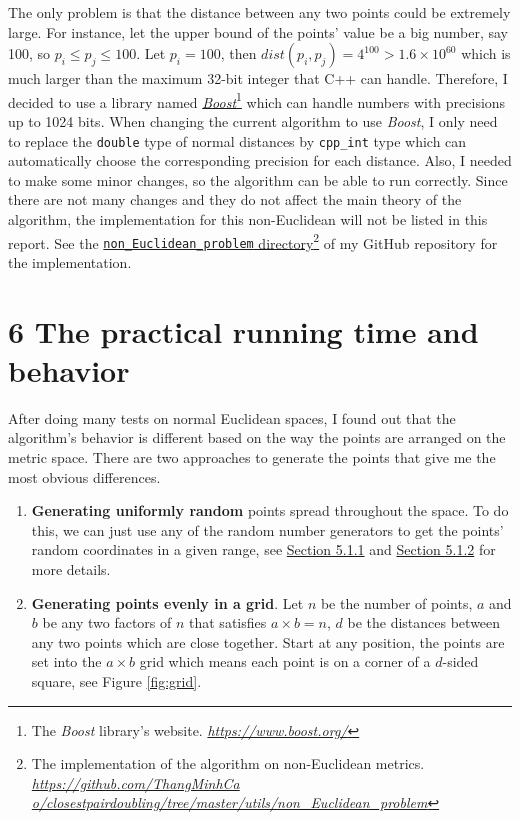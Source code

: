 \documentclass[12pt,english,]{article}
\newcommand{\code}[1]{\colorbox{light-gray}{\texttt{#1}}}
\begin{document}
The only problem is that the distance between any two points could be
extremely large. For instance, let the upper bound of the points' value
be a big number, say 100, so \(p_i \leq p_j \leq 100\). Let
\(p_i = 100\), then \(dist(p_i,p_j)=4^{100} > 1.6 \times 10^{60}\) which
is much larger than the maximum 32-bit integer that C++ can handle.
Therefore, I decided to use a library named
\href{https://www.boost.org/}{\emph{Boost}}\footnote{The \emph{Boost}
  library's website.
  \href{https://www.boost.org/}{\emph{https://www.boost.org/}}} which
can handle numbers with precisions up to 1024 bits. When changing the
current algorithm to use \emph{Boost}, I only need to replace the
\code{double} type of normal distances by \code{cpp\_int} type which can
automatically choose the corresponding precision for each distance.
Also, I needed to make some minor changes, so the algorithm can be able
to run correctly. Since there are not many changes and they do not
affect the main theory of the algorithm, the implementation for this
non-Euclidean will not be listed in this report. See the
\href{https://github.com/ThangMinhCao/closest-pair-doubling/tree/master/utils/non_Euclidean_problem}{\code{non\_Euclidean\_problem}
directory}\footnote{The implementation of the algorithm on non-Euclidean
  metrics.
  \href{https://github.com/ThangMinhCao/closest-pair-doubling/tree/master/utils/non_Euclidean_problem}{\emph{https://github.com/ThangMinhCa}
  \emph{o/closestpairdoubling/tree/master/utils/non\_Euclidean\_problem}}}
of my GitHub repository for the implementation.

\hypertarget{section6}{%
\section{\texorpdfstring{6 \enspace The practical running time and
behavior}{6 The practical running time and behavior}}\label{section6}}

After doing many tests on normal Euclidean spaces, I found out that the
algorithm's behavior is different based on the way the points are
arranged on the metric space. There are two approaches to generate the
points that give me the most obvious differences.

\begin{enumerate}
\def\labelenumi{\arabic{enumi}.}
\item
  \textbf{Generating uniformly random} points spread throughout the
  space. To do this, we can just use any of the random number generators
  to get the points' random coordinates in a given range, see
  \protect\hyperlink{section5.1.1}{Section 5.1.1} and
  \protect\hyperlink{section5.1.2}{Section 5.1.2} for more details.
\item
  \textbf{Generating points evenly in a grid}. Let \(n\) be the number
  of points, \(a\) and \(b\) be any two factors of \(n\) that satisfies
  \(a\times b = n\), \(d\) be the distances between any two points which
  are close together. Start at any position, the points are set into the
  \(a \times b\) grid which means each point is on a corner of a
  \(d\)-sided square, see Figure \ref{fig:grid}.
\end{enumerate}
\end{document}
